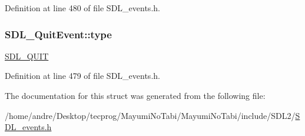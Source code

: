 Definition at line 480 of file S\-D\-L\-\_\-events.\-h.

\hypertarget{struct_s_d_l___quit_event_a51ab0279e6de40249ba93971a8757cf0}{
\subsubsection[{type}]{ S\-D\-L\-\_\-\-Quit\-Event\-::type}}\label{struct_s_d_l___quit_event_a51ab0279e6de40249ba93971a8757cf0}
\hyperlink{_s_d_l__events_8h_a3b589e89be6b35c02e0dd34a55f3fccaa31acc5fdafc86ebe2c1f5c3cae48d603}{S\-D\-L\-\_\-\-Q\-U\-I\-T} 

Definition at line 479 of file S\-D\-L\-\_\-events.\-h.



The documentation for this struct was generated from the following file\-:\begin{DoxyCompactItemize}
\item 
/home/andre/\-Desktop/tecprog/\-Mayumi\-No\-Tabi/\-Mayumi\-No\-Tabi/include/\-S\-D\-L2/\hyperlink{_s_d_l__events_8h}{S\-D\-L\-\_\-events.\-h}\end{DoxyCompactItemize}
